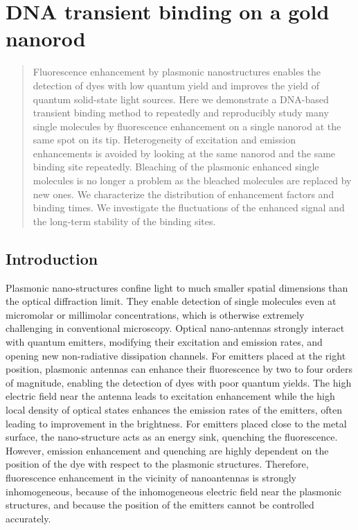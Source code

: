  \chapter{DNA transient binding on a gold nanorod}
\label{chapter:transient}
\graphicspath{{./chapters/c5_transient_binding/figures/}}

\begin{abstract}
  Fluorescence enhancement by plasmonic nanostructures enables the detection of dyes with low quantum yield and improves the yield of quantum solid-state light sources.
  Here we demonstrate a DNA-based transient binding method to repeatedly and reproducibly study many single molecules by fluorescence enhancement on a single nanorod at the same spot on its tip.
  Heterogeneity of excitation and emission enhancements is avoided by looking at the same nanorod and the same binding site repeatedly.
  Bleaching of the plasmonic enhanced single molecules is no longer a problem as the bleached molecules are replaced by new ones.
  We characterize the distribution of enhancement factors and binding times. We investigate the fluctuations of the enhanced signal and the long-term stability of the binding sites.
\end{abstract}

\newpage
\section{Introduction}
Plasmonic nano-structures confine light to much smaller spatial dimensions than the optical diffraction limit. They enable detection of single molecules even at micromolar or millimolar concentrations, which is otherwise extremely challenging in conventional microscopy.\cite{levene2003zeromode,punj2013a,schuller2010plasmonics}
Optical nano-antennas strongly interact with quantum emitters, modifying their excitation and emission rates, and opening new non-radiative dissipation channels.
For emitters placed at the right position, plasmonic antennas can enhance their fluorescence by two to four orders of magnitude, enabling the detection of dyes with poor quantum yields.\cite{lakowicz2005radiative,anger2006enhancement,kinkhabwala2009large,acuna2012fluorescence,yuan2013thousandfold,khatua2014resonant}
The high electric field near the antenna leads to excitation enhancement while the high local density of optical states enhances the emission rates of the emitters, often leading to improvement in the brightness.
For emitters placed close to the metal surface, the nano-structure acts as an energy sink, quenching the fluorescence.\cite{seelig2007nanoparticleinduced,muskens2007strong,acuna2012distance,matsuzaki2017strong}
However, emission enhancement and quenching are highly dependent on the position of the dye with respect to the plasmonic structures. Therefore, fluorescence enhancement in the vicinity of nanoantennas is strongly inhomogeneous, because of the inhomogeneous electric field near the plasmonic structures, and because the position of the emitters cannot be controlled accurately. 


